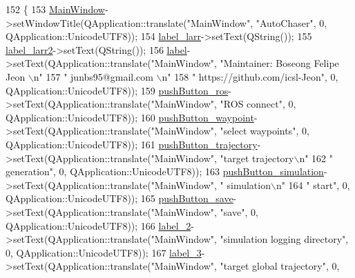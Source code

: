 \begin{DoxyCode}
152     \{
153         \hyperlink{class_main_window}{MainWindow}->setWindowTitle(QApplication::translate(\textcolor{stringliteral}{"MainWindow"}, \textcolor{stringliteral}{"AutoChaser"}, 0, 
      QApplication::UnicodeUTF8));
154         \hyperlink{class_ui___main_window_a32587f1e879f5b685d375d2daa20f7a6}{label\_larr}->setText(QString());
155         \hyperlink{class_ui___main_window_a06fc1a01ac3ba3d4d1f75a0e8ab06684}{label\_larr2}->setText(QString());
156         \hyperlink{class_ui___main_window_ad9c89133780f28e6efa2ec17ceb9cff5}{label}->setText(QApplication::translate(\textcolor{stringliteral}{"MainWindow"}, \textcolor{stringliteral}{"Maintainer: Boseong Felipe Jeon \(\backslash\)n"}
157 \textcolor{stringliteral}{" junbs95@gmail.com \(\backslash\)n"}
158 \textcolor{stringliteral}{" https://github.com/icsl-Jeon"}, 0, QApplication::UnicodeUTF8));
159         \hyperlink{class_ui___main_window_a2667c2b4f9c61bf9895b73d07d4b5172}{pushButton\_ros}->setText(QApplication::translate(\textcolor{stringliteral}{"MainWindow"}, \textcolor{stringliteral}{"ROS connect"}, 0, 
      QApplication::UnicodeUTF8));
160         \hyperlink{class_ui___main_window_a6b5d7c0f96cdb3276a33746fbcd7e8c7}{pushButton\_waypoint}->setText(QApplication::translate(\textcolor{stringliteral}{"MainWindow"}, \textcolor{stringliteral}{"select
       waypoints"}, 0, QApplication::UnicodeUTF8));
161         \hyperlink{class_ui___main_window_a9d644554288462450d209192c1998095}{pushButton\_trajectory}->setText(QApplication::translate(\textcolor{stringliteral}{"MainWindow"}, \textcolor{stringliteral}{"target
       trajectory\(\backslash\)n"}
162 \textcolor{stringliteral}{" generation"}, 0, QApplication::UnicodeUTF8));
163         \hyperlink{class_ui___main_window_afd109ead0ad1ae7ae67ad1df803c9c38}{pushButton\_simulation}->setText(QApplication::translate(\textcolor{stringliteral}{"MainWindow"}, \textcolor{stringliteral}{"
      simulation\(\backslash\)n"}
164 \textcolor{stringliteral}{" start"}, 0, QApplication::UnicodeUTF8));
165         \hyperlink{class_ui___main_window_a257d4df0fe652a526e4fddba93c7a7d8}{pushButton\_save}->setText(QApplication::translate(\textcolor{stringliteral}{"MainWindow"}, \textcolor{stringliteral}{"save"}, 0, 
      QApplication::UnicodeUTF8));
166         \hyperlink{class_ui___main_window_a2e2516d755e4dd53fc905dabddf2738a}{label\_2}->setText(QApplication::translate(\textcolor{stringliteral}{"MainWindow"}, \textcolor{stringliteral}{"simulation logging directory"}, 0, 
      QApplication::UnicodeUTF8));
167         \hyperlink{class_ui___main_window_a0376fd90247280e7c7957cc70628708c}{label\_3}->setText(QApplication::translate(\textcolor{stringliteral}{"MainWindow"}, \textcolor{stringliteral}{"target global trajectory"}, 0, 

\end{DoxyCode}
